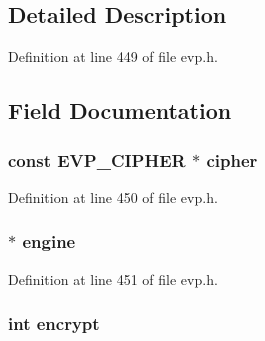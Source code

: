\subsection{Detailed Description}


Definition at line 449 of file evp.\+h.



\subsection{Field Documentation}
\subsubsection[{\texorpdfstring{cipher}{cipher}}]{\setlength{\rightskip}{0pt plus 5cm}const {\bf E\+V\+P\+\_\+\+C\+I\+P\+H\+ER} $\ast$ cipher}\hypertarget{structevp__cipher__ctx__st_a535356548694b85372c7d1fb18e05f1d}{}\label{structevp__cipher__ctx__st_a535356548694b85372c7d1fb18e05f1d}


Definition at line 450 of file evp.\+h.

\subsubsection[{\texorpdfstring{engine}{engine}}]{ $\ast$ engine}\hypertarget{structevp__cipher__ctx__st_ae4bca26806adfdaf8a28463c98ddf03a}{}\label{structevp__cipher__ctx__st_ae4bca26806adfdaf8a28463c98ddf03a}


Definition at line 451 of file evp.\+h.

\subsubsection[{\texorpdfstring{encrypt}{encrypt}}]{\setlength{\rightskip}{0pt plus 5cm}int encrypt}\hypertarget{structevp__cipher__ctx__st_a3cde830514004debd73105536318890c}{}\label{structevp__cipher__ctx__st_a3cde830514004debd73105536318890c}


